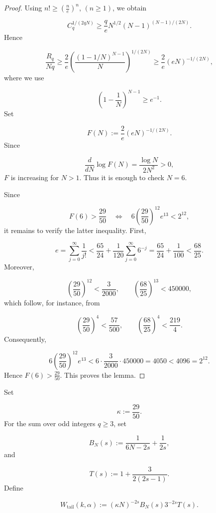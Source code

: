 \documentclass[11pt]{article}
\theoremstyle{plain}
\theoremstyle{definition}
\theoremstyle{remark}
\begin{document}
\begin{proof}
Using $n! \ge \left( \frac{n}{e} \right)^{n}$, $(n \ge 1)$, we obtain

\[
  C_q^{1/(2qN)} \ge \frac{q}{e} N^{1/2}(N-1)^{(N-1)/(2N)} .
\]
Hence

\[
  \frac{R_q}{Nq} \ge \frac{2}{e} \left( \frac{(1-1/N)^{N-1}}{N} \right)^{1/(2N)} \ge \frac{2}{e}(eN)^{-1/(2N)} ,
\]
where we use

\[
  \left( 1 - \frac{1}{N} \right)^{N-1} \ge e^{-1} .
\]
Set

\[
  F(N) := \frac{2}{e}(eN)^{-1/(2N)} .
\]
Since

\[
  \frac{d}{dN} \log F(N) = \frac{\log N}{2N^{2}} > 0 ,
\]
$F$ is increasing for $N > 1$. Thus it is enough to check $N = 6$.

Since

\[
  F(6) > \frac{29}{50} \quad  \Longleftrightarrow \quad  6\left( \frac{29}{50} \right)^{12} e^{13} < 2^{12} ,
\]
it remains to verify the latter inequality. First,

\[
  e = \sum_{j=0}^{\infty } \frac{1}{j!} < \frac{65}{24} + \frac{1}{120}\sum_{j=0}^{\infty } 6^{-j} = \frac{65}{24} + \frac{1}{100} < \frac{68}{25} .
\]
Moreover,

\[
  \left( \frac{29}{50} \right)^{12} < \frac{3}{2000} , \qquad  \left( \frac{68}{25} \right)^{13} < 450000 ,
\]
which follow, for instance, from

\[
  \left( \frac{29}{50} \right)^{4} < \frac{57}{500} , \qquad  \left( \frac{68}{25} \right)^{4} < \frac{219}{4} .
\]
Consequently,

\[
  6\left( \frac{29}{50} \right)^{12} e^{13} < 6 \cdot \frac{3}{2000} \cdot 450000 = 4050 < 4096 = 2^{12} .
\]
Hence $F(6) > \frac{29}{50}$. This proves the lemma.
\end{proof}

Set

\[
  \kappa := \frac{29}{50} .
\]
For the sum over odd integers $q \ge 3$, set

\begin{equation}\label{eq:BN}
  B_N(s) := \frac{1}{6N-2s} + \frac{1}{2s} ,
\end{equation}
and

\begin{equation}\label{eq:Ts}
  T(s) := 1 + \frac{3}{2(2s-1)} .
\end{equation}
Define

\begin{equation}\label{eq:Wtaildef}
  W_{\mathrm{tail}}(k,\alpha ) := (\kappa N)^{-2s} B_N(s) 3^{-2s} T(s) .
\end{equation}
\end{document}
